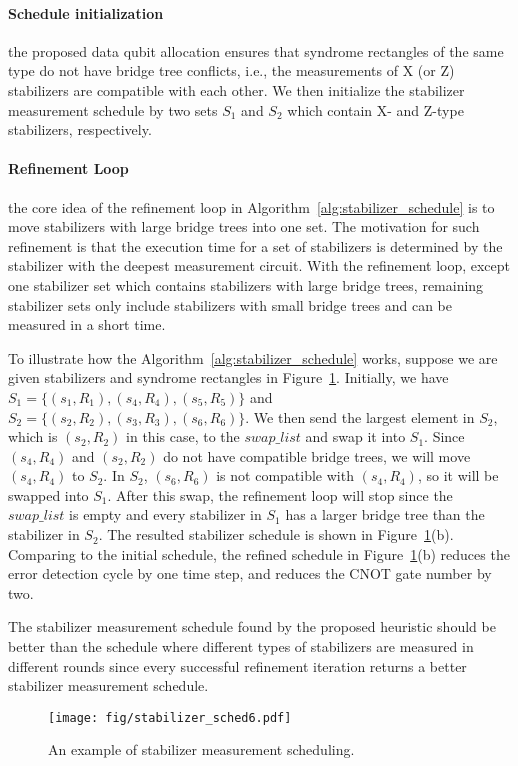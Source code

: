 \paragraph{Schedule initialization} the proposed data qubit allocation ensures that syndrome rectangles of the same type do not have bridge tree conflicts, i.e., the measurements of X (or Z) stabilizers are compatible with each other. We then initialize the stabilizer measurement schedule by two sets $S_1$ and $S_2$ which contain X- and Z-type stabilizers, respectively.

\paragraph{Refinement Loop} the core idea of the refinement loop in Algorithm~\ref{alg:stabilizer_schedule} is to move stabilizers with large bridge trees into one set. The motivation for such refinement is that the execution time for a set of stabilizers is determined by the stabilizer with the deepest measurement circuit. With the refinement loop, except one stabilizer set which contains stabilizers with 
large bridge trees, remaining stabilizer sets only include stabilizers with small bridge trees and can be measured in a short time. %

To illustrate how the Algorithm~\ref{alg:stabilizer_schedule} works, suppose we are given stabilizers and syndrome rectangles in Figure~\ref{fig:stabilizer_schedule}. Initially, we have $S_1 = \{(s_1, R_1), (s_4, R_4), (s_5, R_5)\}$ and $S_2 = \{(s_2, R_2), (s_3, R_3), (s_6, R_6)\}$. We then send the largest element in $S_2$, which is $(s_2, R_2)$ in this case, to the $swap\_list$ and swap it into $S_1$. Since $(s_4, R_4)$ and $(s_2, R_2)$ do not have compatible bridge trees, we will move $(s_4, R_4)$ to $S_2$.
In $S_2$, $(s_6, R_6)$ is not compatible with $(s_4, R_4)$, so it will be swapped into $S_1$. 
After this swap, the refinement loop will stop since the $swap\_list$ is empty and every stabilizer in $S_1$ has a larger bridge tree than the stabilizer in $S_2$. The resulted stabilizer schedule is shown in Figure~\ref{fig:stabilizer_schedule}(b). Comparing to the initial schedule, the refined schedule in Figure~\ref{fig:stabilizer_schedule}(b) reduces the error detection cycle by one time step, and reduces the CNOT gate number by two.

The stabilizer measurement schedule found by the proposed heuristic should be better than the schedule where different types of stabilizers are measured in different rounds since every successful refinement iteration returns a better stabilizer measurement schedule.

\begin{figure}[ht!]
    \centering
    \texttt{[image: fig/stabilizer\_sched6.pdf]}
    \caption{ An example of stabilizer measurement scheduling. } %
    \label{fig:stabilizer_schedule}
\end{figure}